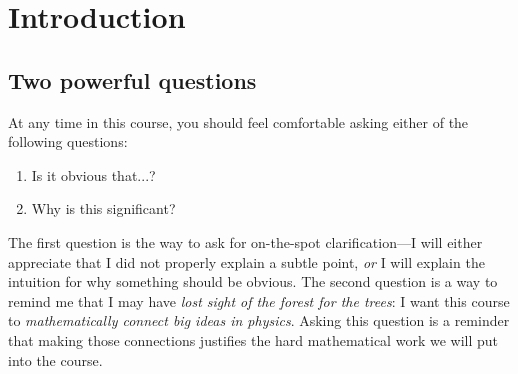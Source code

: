 \documentclass[12pt, oneside]{report}    %
\let\oldsection\section
\def\section{%
  \setcounter{sidenote}{1}%
  \oldsection
}
\begin{document}
\newpage

\small
\setcounter{tocdepth}{2}
\tableofcontents
\normalsize
\clearpage
\restoregeometry        %



% 


% 
% 
% 
% 
% 



\chapter{Introduction}

\section{Two powerful questions}
At any time in this course, you should feel comfortable asking either of the following questions:
\begin{enumerate}
    \item Is it obvious that...?
    \item Why is this significant?
\end{enumerate}
The first question is the way to ask for on-the-spot clarification---I will either appreciate that I did not properly explain a subtle point, \emph{or} I will explain the intuition for why something should be obvious. The second question is a way to remind me that I may have \emph{lost sight of the forest for the trees}: I want this course to \emph{mathematically connect big ideas in physics}. Asking this question is a reminder that making those connections justifies the hard mathematical work we will put into the course.
\end{document}
